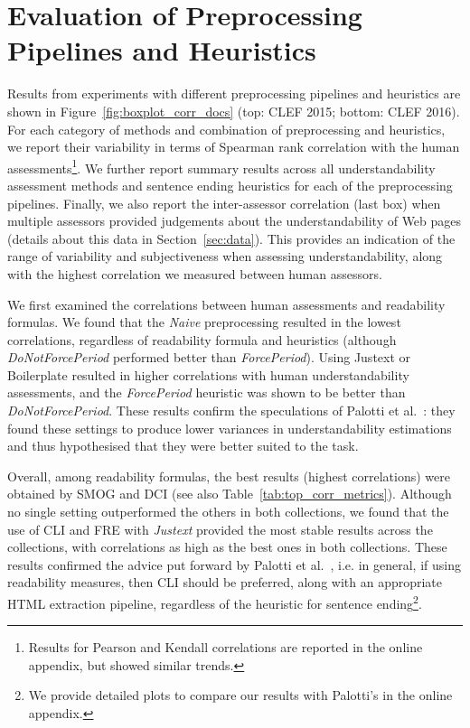 \section*{Evaluation of Preprocessing Pipelines and Heuristics}
\label{sec:which_preprocessing}

Results from experiments with different preprocessing pipelines and heuristics are shown in Figure~\ref{fig:boxplot_corr_docs} (top: CLEF 2015; bottom: CLEF 2016). 
For each category of methods and combination of preprocessing and heuristics, we report their variability in terms of Spearman rank correlation with the human assessments\footnote{Results for Pearson and Kendall correlations are reported in the online appendix, but showed similar trends.}. 
We further report summary results across all understandability assessment methods and sentence ending heuristics for each of the preprocessing pipelines. Finally, we also report the inter-assessor correlation (last box) when multiple assessors provided judgements about the understandability of Web pages (details about this data in Section~\ref{sec:data}). This provides an indication of the range of variability and subjectiveness when assessing understandability, along with the highest correlation we measured between human assessors. 
 
We first examined the correlations between human assessments and readability formulas. We found that the \textit{Naive} preprocessing resulted in the lowest correlations, regardless of readability formula and heuristics (although \textit{DoNotForcePeriod} performed better than \textit{ForcePeriod}). Using Justext or Boilerplate resulted in higher correlations with human understandability assessments, and the \textit{ForcePeriod} heuristic was shown to be better than \textit{DoNotForcePeriod}. These results confirm the speculations of Palotti et al.~\cite{palotti15}: they found these settings to produce lower variances in understandability estimations and thus hypothesised that they were better suited to the task.

Overall, among readability formulas, the best results (highest correlations) were obtained by SMOG and DCI (see also Table~\ref{tab:top_corr_metrics}). Although no single setting outperformed the others in both collections, we found that the use of CLI and FRE with \textit{Justext} provided the most stable results across the collections, with correlations as high as the best ones in both collections.
These results confirmed the advice put forward by Palotti et al.~\cite{palotti15}, i.e. in general, if using readability measures, then CLI should be preferred, along with an appropriate HTML extraction pipeline, regardless of the heuristic for sentence ending\footnote{We provide detailed plots to compare our results with Palotti's in the online appendix.}.


